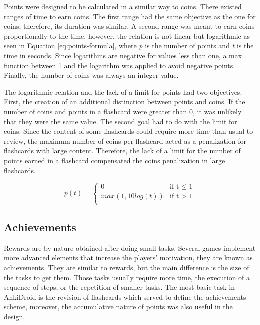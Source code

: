 Points were designed to be calculated in a similar way to coins. There existed ranges of time to earn coins. The first range had the same objective as the one for coins, therefore, its duration was similar. A second range was meant to earn coins proportionally to the time, however, the relation is not linear but logarithmic as seen in Equation \ref{eq:points-formula}, where \textit{p} is the number of points and \textit{t} is the time in seconds. Since logarithms are negative for values less than one, a max function between 1 and the logarithm was applied to avoid negative points. Finally, the number of coins was always an integer value.

The logarithmic relation and the lack of a limit for points had two objectives. First, the creation of an additional distinction between points and coins. If the number of coins and points in a flashcard were greater than 0, it was unlikely that they were the same value. The second goal had to do with the limit for coins. Since the content of some flashcards could require more time than usual to review, the maximum number of coins per flashcard acted as a penalization for flashcards with large content. Therefore, the lack of a limit for the number of points earned in a flashcard compensated the coins penalization in large flashcards.

\begin{equation}
  p(t) =
      \begin{cases}
        0 & \text{if t $\leq$ 1}\\
        max(1, 10log(t)) & \text{if t $>$ 1}\\
      \end{cases}
    \label{eq:points-formula}
\end{equation}

\subsection{Achievements}
Rewards are by nature obtained after doing small tasks. Several games implement more advanced elements that increase the players' motivation, they are known as achievements. They are similar to rewards, but the main difference is the size of the tasks to get them. Those tasks usually require more time, the execution of a sequence of steps, or the repetition of smaller tasks. The most basic task in AnkiDroid is the revision of flashcards which served to define the achievements scheme, moreover, the accumulative nature of points was also useful in the design.

